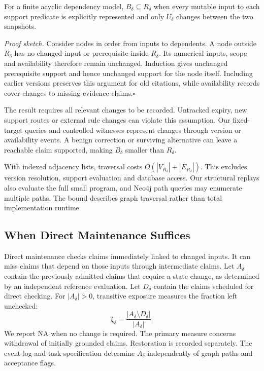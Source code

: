 \documentclass[runningheads]{llncs}
\begin{document}
\begin{proposition}
For a finite acyclic dependency model, $B_\delta\subseteq R_\delta$ when every
mutable input to each support predicate is explicitly represented and only
$U_\delta$ changes between the two snapshots.
\end{proposition}
\noindent\emph{Proof sketch.}
Consider nodes in order from inputs to dependents. A node outside $R_\delta$
has no changed input or prerequisite inside $R_\delta$. Its numerical inputs,
scope and availability therefore remain unchanged. Induction gives unchanged
prerequisite support and hence unchanged support for the node itself.
Including earlier versions preserves this argument for old citations, while
availability records cover changes to missing-evidence claims.\hfill$\square$

The result requires all relevant changes to be recorded. Untracked expiry,
new support routes or external rule changes can violate this assumption.
Our fixed-target queries and controlled witnesses represent changes through
version or availability events. A benign correction or surviving alternative
can leave a reachable claim supported, making $B_\delta$ smaller than $R_\delta$.

With indexed adjacency lists, traversal costs
$O(|V_{R_\delta}|+|E_{R_\delta}|)$. This excludes version resolution, support
evaluation and database access. Our structural replays also evaluate the full
small program, and Neo4j path queries may enumerate multiple paths.
The bound describes graph traversal rather than total implementation runtime.





\subsection{When Direct Maintenance Suffices}

Direct maintenance checks claims immediately linked to changed inputs.
It can miss claims that depend on those inputs through intermediate claims.
Let $A_\delta$ contain the previously admitted claims that require a state
change, as determined by an independent reference evaluation. Let $D_\delta$
contain the claims scheduled for direct checking. For $|A_\delta|>0$,
transitive exposure measures the fraction left unchecked:
\begin{equation}
 \xi_\delta=\frac{|A_\delta\setminus D_\delta|}{|A_\delta|}.
 \label{eq:exposure}
\end{equation}
We report NA when no change is required. The primary measure concerns
withdrawal of initially grounded claims. Restoration is recorded separately.
The event log and task specification determine $A_\delta$ independently
of graph paths and acceptance flags.
\end{document}
